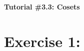 \documentclass{article}
\begin{document}
	\centering
	\LARGE\textbf{Tutorial \#3.3: Cosets}\\
	
	\justify\Large
	\section{Exercise 1:}
\end{document}
